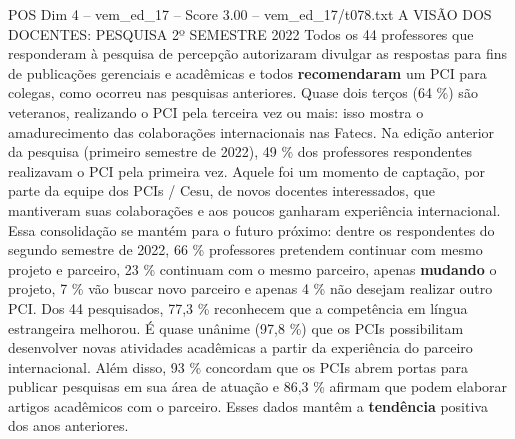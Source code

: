 \begin{textsample}{POS Dim 4 – vem\_ed\_17 – Score 3.00 – vem\_ed\_17/t078.txt}  \label{ex:f4_pos_084}
A VISÃO DOS DOCENTES: PESQUISA 2º SEMESTRE 2022 Todos os 44 professores que responderam à pesquisa de percepção autorizaram divulgar as respostas para fins de publicações gerenciais e acadêmicas e todos \textbf{recomendaram} um PCI para colegas, como ocorreu nas pesquisas anteriores.
Quase dois terços (64 \%) são veteranos, realizando o PCI pela terceira vez ou mais: isso mostra o amadurecimento das colaborações internacionais nas Fatecs.
Na edição anterior da pesquisa (primeiro semestre de 2022), 49 \% dos professores respondentes realizavam o PCI pela primeira vez.
Aquele foi um momento de captação, por parte da equipe dos PCIs / Cesu, de novos docentes interessados, que mantiveram suas colaborações e aos poucos ganharam experiência internacional.
Essa consolidação se mantém para o futuro próximo: dentre os respondentes do segundo semestre de 2022, 66 \% professores pretendem continuar com mesmo projeto e parceiro, 23 \% continuam com o mesmo parceiro, apenas \textbf{mudando} o projeto, 7 \% vão buscar novo parceiro e apenas 4 \% não desejam realizar outro PCI.
Dos 44 pesquisados, 77,3 \% reconhecem que a competência em língua estrangeira melhorou.
É quase unânime (97,8 \%) que os PCIs possibilitam desenvolver novas atividades acadêmicas a partir da experiência do parceiro internacional.
Além disso, 93 \% concordam que os PCIs abrem portas para publicar pesquisas em sua área de atuação e 86,3 \% afirmam que podem elaborar artigos acadêmicos com o parceiro.
Esses dados mantêm a \textbf{tendência} positiva dos anos anteriores.

\end{textsample}
